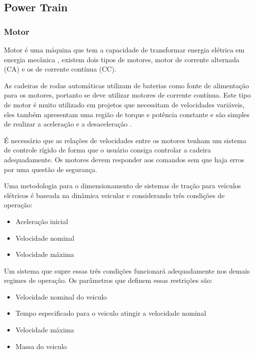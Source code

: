 \subsection{Power Train}

\subsubsection{Motor}

	Motor é uma máquina que tem a capacidade de transformar energia elétrica em energia mecânica \cite{projeto_cadeira_rodas_inteligente}, existem dois tipos de motores, motor de corrente alternada (CA) e os de corrente contínua (CC).

  As cadeiras de rodas automáticas utilizam de baterias como fonte de alimentação para os motores, portanto se deve utilizar motores de corrente contínua. Este tipo de motor é muito utilizado em projetos que necessitam de velocidades variáveis, eles também apresentam uma região de torque e potência constante e são simples de realizar a aceleração e a desaceleração \cite{manual_bateria_unipower}.

  É necessário que as relações de velocidades entre os motores tenham um sistema de controle rígido de forma que o usuário consiga controlar a cadeira adequadamente. Os motores devem responder aos comandos sem que haja erros por uma questão de segurança.

  Uma metodologia para o dimensionamento de sistemas de tração para veículos elétricos é baseada na dinâmica veicular e considerando três condições de operação:
  \begin{itemize}
    \item Aceleração inicial
    \item Velocidade nominal
    \item Velocidade máxima
  \end{itemize}

  Um sistema que supre essas três condições funcionará adequadamente nos demais regimes de operação. Os parâmetros que definem essas restrições são:
  \begin{itemize}
    \item Velocidade nominal do veiculo
    \item Tempo especificado para o veiculo atingir a velocidade nominal
    \item Velocidade máxima
    \item Massa do veiculo
  \end{itemize}

